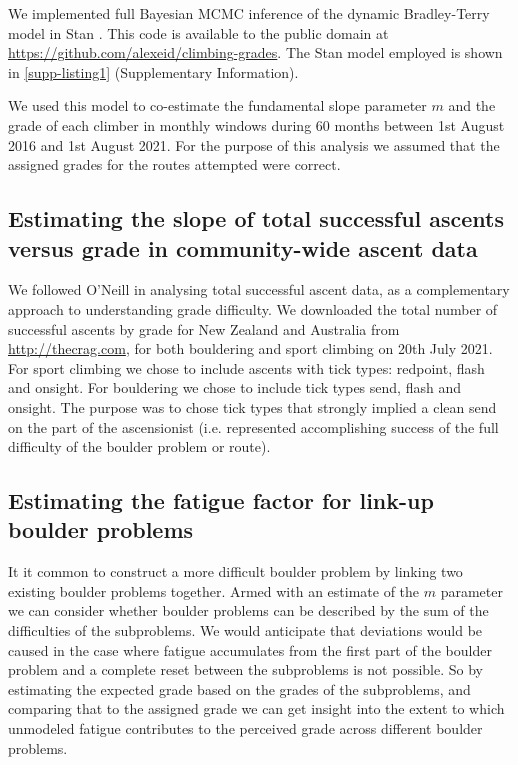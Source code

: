 \documentclass{article}
\begin{document}
We implemented full Bayesian MCMC inference of the dynamic Bradley-Terry model in Stan \cite{carpenter2017stan}. This code is available to the public domain at \url{https://github.com/alexeid/climbing-grades}.
The Stan model employed is shown in \cref{supp-listing1} (Supplementary Information).

We used this model to co-estimate the fundamental slope parameter $m$ and the grade of each climber in monthly windows during 60 months between 1st August 2016 and 1st August 2021. For the purpose of this analysis we assumed that the assigned grades for the routes attempted were correct.

\subsection*{Estimating the slope of total successful ascents versus grade in community-wide ascent data}

We followed O'Neill \cite{oneill2002} in analysing total successful ascent data, as a complementary approach to understanding grade difficulty. We downloaded the total number of successful ascents by grade for New Zealand and Australia from \url{http://thecrag.com}, for both bouldering and sport climbing on 20th July 2021. For sport climbing we chose to include ascents with tick types: \gls{redpoint}, \gls{flash} and \gls{onsight}. For bouldering we chose to include tick types \gls{send}, \gls{flash} and \gls{onsight}. The purpose was to chose tick types that strongly implied a clean send on the part of the ascensionist (i.e. represented accomplishing success of the full difficulty of the boulder problem or route).
\subsection*{Estimating the fatigue factor for link-up boulder problems}

It it common to construct a more difficult boulder problem by linking two existing boulder problems together. Armed with an estimate of the $m$ parameter we can consider whether boulder problems can be described by the sum of the difficulties of the subproblems. We would anticipate that deviations would be caused in the case where fatigue accumulates from the first part of the boulder problem and a complete reset between the subproblems is not possible. So by estimating the expected grade based on the grades of the subproblems, and comparing that to the assigned grade we can get insight into the extent to which unmodeled fatigue contributes to the perceived grade across different boulder problems.
\end{document}
